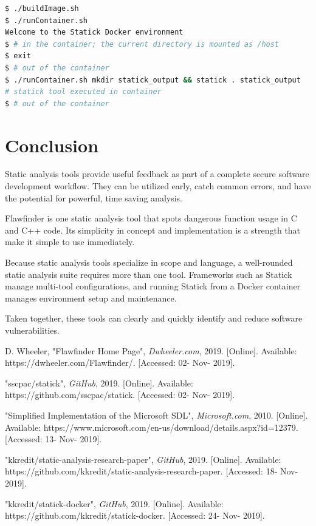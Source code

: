 \documentclass[journal]{IEEEtran}
\begin{document}
\begin{lstlisting}[language=bash, caption=Using the Statick Docker Container, label=lst:statick_container]
$ ./buildImage.sh
$ ./runContainer.sh
Welcome to the Statick Docker environment
$ # in the container; the current directory is mounted as /host
$ exit
$ # out of the container
$ ./runContainer.sh mkdir statick_output && statick . statick_output
# statick tool executed in container
$ # out of the container
\end{lstlisting}

\section{Conclusion}

Static analysis tools provide useful feedback as part of a complete secure software development
workflow. They can be utilized early, catch common errors, and have the potential for powerful, time
saving analysis.

Flawfinder is one static analysis tool that spots dangerous function usage in C and C++ code. Its
simplicity in concept and implementation is a strength that make it simple to use immediately.

Because static analysis tools specialize in scope and language, a well-rounded static analysis suite
requires more than one tool. Frameworks such as Statick manage multi-tool configurations, and
running Statick from a Docker container manages environment setup and maintenance.

Taken together, these tools can clearly and quickly identify and reduce software vulnerabilities.


\begin{thebibliography}{00}

 D. Wheeler, "Flawfinder Home Page", \textit{Dwheeler.com}, 2019. [Online].
Available: https://dwheeler.com/Flawfinder/. [Accessed: 02- Nov- 2019].

 "sscpac/statick", \textit{GitHub}, 2019. [Online]. Available:
https://github.com/sscpac/statick. [Accessed: 02- Nov- 2019].

 "Simplified Implementation of the Microsoft SDL", \textit{Microsoft.com}, 2010.
[Online]. Available: https://www.microsoft.com/en-us/download/details.aspx?id=12379. [Accessed: 13-
Nov- 2019].

 "kkredit/static-analysis-research-paper", \textit{GitHub}, 2019. [Online].
Available: https://github.com/kkredit/static-analysis-research-paper. [Accessed: 18- Nov- 2019].

 "kkredit/statick-docker", \textit{GitHub}, 2019. [Online]. Available:
https://github.com/kkredit/statick-docker. [Accessed: 24- Nov- 2019].

\end{thebibliography}
\end{document}
